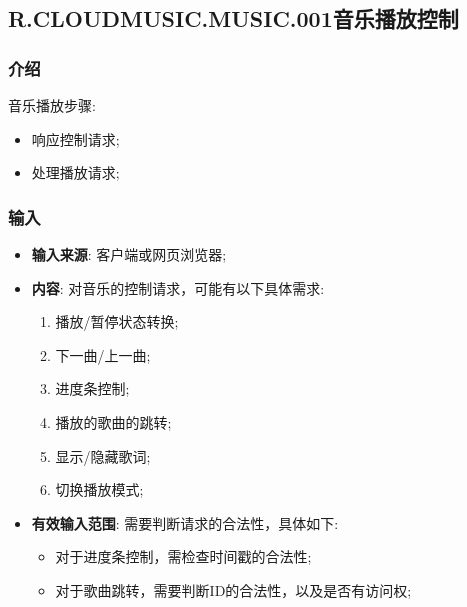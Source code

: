 \subsection{R.CLOUDMUSIC.MUSIC.001音乐播放控制}
\subsubsection{介绍}
	音乐播放步骤: 
	\begin{itemize}
		\item 响应控制请求;
		\item 处理播放请求;
	\end{itemize}
\subsubsection{输入}
	\begin{itemize}
		\item \textbf{输入来源}: 客户端或网页浏览器;
		\item \textbf{内容}: 对音乐的控制请求，可能有以下具体需求: 
		\begin{enumerate}
			\item 播放/暂停状态转换;
			\item 下一曲/上一曲;
			\item 进度条控制;
			\item 播放的歌曲的跳转;
			\item 显示/隐藏歌词;
			\item 切换播放模式;
		\end{enumerate}
		\item \textbf{有效输入范围}: 需要判断请求的合法性，具体如下: 
		\begin{itemize}
			\item 对于进度条控制，需检查时间戳的合法性;
			\item 对于歌曲跳转，需要判断ID的合法性，以及是否有访问权;
		\end{itemize}
	\end{itemize}
